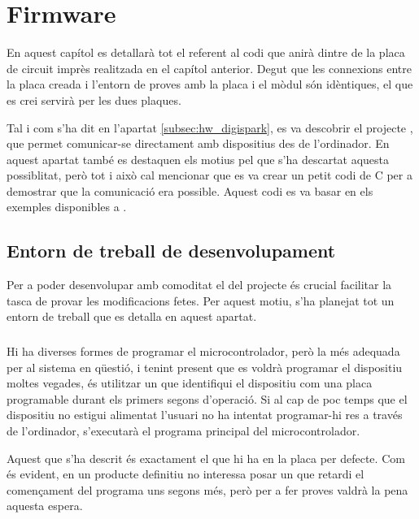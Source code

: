 \chapter{Firmware}

En aquest capítol es detallarà tot el referent al codi que anirà dintre de la
placa de circuit imprès realitzada en el capítol anterior. Degut que les
connexions entre la placa creada i l'entorn de proves amb la placa 
i el mòdul  són idèntiques, el  que es crei servirà
per les dues plaques.

Tal i com s'ha dit en l'apartat \ref{subsec:hw_digispark}, es va descobrir
el projecte , que permet comunicar-se directament amb
dispositius  des de l'ordinador. En aquest apartat també es destaquen
els motius pel que s'ha descartat aquesta possiblitat, però tot i això cal
mencionar que es va crear un petit codi de C per a demostrar que la comunicació
era possible. Aquest codi es va basar en els exemples disponibles a
\cite{I2cTinyUsb}.

\section{Entorn de treball de desenvolupament}

Per a poder desenvolupar amb comoditat el  del projecte és crucial
facilitar la tasca de provar les modificacions fetes. Per aquest motiu, s'ha
planejat tot un entorn de treball que es detalla en aquest apartat.

\subsection{}
\label{subsec:bootloader}

Hi ha diverses formes de programar el microcontrolador, però la més adequada
per al sistema en qüestió, i tenint present que es voldrà programar el dispositiu
moltes vegades, és utilitzar un  que identifiqui el dispositiu
com una placa programable durant els primers segons d'operació. Si al cap de
poc temps que el dispositiu no estigui alimentat l'usuari no ha intentat
programar-hi res a través de l'ordinador, s'executarà el programa principal
del microcontrolador.

Aquest  que s'ha descrit és exactament el que hi ha en la
placa  per defecte. Com és evident, en un producte definitiu no
interessa posar un  que retardi el començament del programa
uns segons més, però per a fer proves valdrà la pena aquesta espera.

